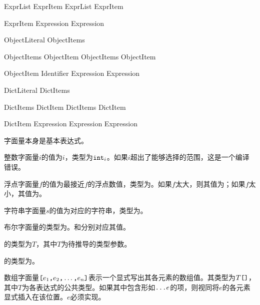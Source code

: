\begin{bnf}{ExprList}
    ExprItem \br
    ExprList \terminal{,} ExprItem
\end{bnf}

\begin{bnf}{ExprItem}
    Expression \br
     Expression
\end{bnf}

\begin{bnf}{ObjectLiteral}
    \terminal{\{} ObjectItems\bnfq \terminal{\}}
\end{bnf}

\begin{bnf}{ObjectItems}
    ObjectItem \br
    ObjectItems \terminal{,} ObjectItem
\end{bnf}

\begin{bnf}{ObjectItem}
    Identifier \terminal{:} Expression \br
     Expression
\end{bnf}

\begin{bnf}{DictLiteral}
    \terminal{\{|} DictItems\bnfq \terminal{|\}}
\end{bnf}

\begin{bnf}{DictItems}
    DictItem \br
    DictItems \terminal{,} DictItem
\end{bnf}

\begin{bnf}{DictItem}
    Expression \terminal{:} Expression \br
     Expression
\end{bnf}

\pnum
字面量本身是基本表达式。

\pnum
整数字面量$i$的值为$i$，类型为$\texttt{int}_i$。如果$i$超出了能够选择的范围，这是一个编译错误。

\pnum
浮点字面量$f$的值为最接近$f$的浮点数值，类型为。如果$f$太大，则其值为；如果$f$太小，其值为。

\pnum
字符串字面量$s$的值为对应的字符串，类型为。

\pnum
布尔字面量的类型为。和分别对应其值。

\pnum
{}的类型为$T$，其中$T$为待推导的类型参数。

\pnum
\tcode{()}的类型为。

\pnum
数组字面量$\texttt{[}e_1\texttt{,} e_2\texttt{,} \ldots\texttt{,} e_n\texttt{]}$表示一个显式写出其各元素的数组值。其类型为$T\texttt{[]}$，其中$T$为各表达式的公共类型。如果其中包含形如$\texttt{...}e$的项，则视同将$e$的各元素显式插入在该位置。$e$必须实现。


